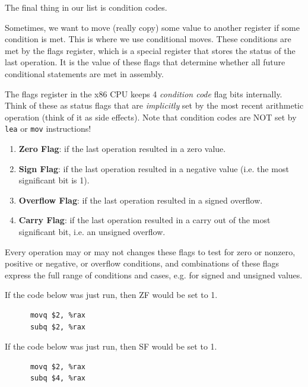   The final thing in our list is condition codes. 

  Sometimes, we want to move (really copy) some value to another register if some condition is met. This is where we use conditional moves. These conditions are met by the flags register, which is a special register that stores the status of the last operation. It is the value of these flags that determine whether all future conditional statements are met in assembly. 
  
  \begin{definition}
    The flags register in the x86 CPU keeps 4 \textit{condition code} flag bits internally. Think of these as status flags that are \textit{implicitly} set by the most recent arithmetic operation (think of it as side effects). Note that condition codes are NOT set by \texttt{lea} or \texttt{mov} instructions! 
    \begin{enumerate}
      \item \textbf{Zero Flag}: if the last operation resulted in a zero value.
      \item \textbf{Sign Flag}: if the last operation resulted in a negative value (i.e. the most significant bit is 1).
      \item \textbf{Overflow Flag}: if the last operation resulted in a signed overflow.
      \item \textbf{Carry Flag}: if the last operation resulted in a carry out of the most significant bit, i.e. an unsigned overflow. 
    \end{enumerate}
    Every operation may or may not changes these flags to test for zero or nonzero, positive or negative, or overflow conditions, and combinations of these flags express the full range of conditions and cases, e.g. for signed and unsigned values. 
  \end{definition}

  \begin{example}
    If the code below was just run, then ZF would be set to 1. 
    \begin{lstlisting}
      movq $2, %rax 
      subq $2, %rax
    \end{lstlisting}
  \end{example}

  \begin{example}
    If the code below was just run, then SF would be set to 1. 
    \begin{lstlisting}
      movq $2, %rax 
      subq $4, %rax
    \end{lstlisting}
  \end{example}


